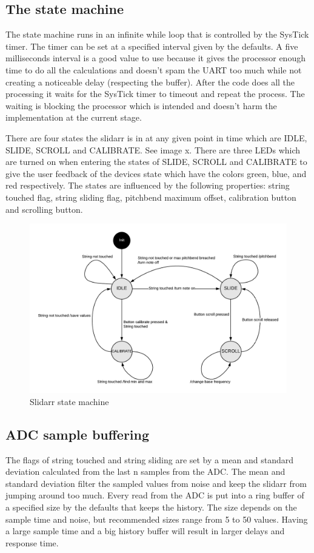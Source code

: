 \documentclass{article}
\begin{document}
\subsection{The state machine}

The state machine runs in an infinite while loop that is controlled by the SysTick timer. The timer can be set at a specified interval given by the defaults. A five milliseconds interval is a good value to use because it gives the processor enough time to do all the calculations and doesn't spam the UART too much while not creating a noticeable delay (respecting the buffer). After the code does all the processing it waits for the SysTick timer to timeout and repeat the process. The waiting is blocking the processor which is intended and doesn't harm the implementation at the current stage.

There are four states the slidarr is in at any given point in time which are IDLE, SLIDE, SCROLL and CALIBRATE. See image x. There are three LEDs which are turned on when entering the states of SLIDE, SCROLL and CALIBRATE to give the user feedback of the devices state which have the colors green, blue, and red respectively.
The states are influenced by the following properties: string touched flag, string sliding flag, pitchbend maximum offset, calibration button and scrolling button.

\begin{figure}[ht]
  \centering
  \includegraphics[width=1\textwidth]{SlidarrStateMachine.png}
  \caption{Slidarr state machine}
  \label{fig:slidarr state machine}
\end{figure}

\subsection{ADC sample buffering}
The flags of string touched and string sliding are set by a mean and standard deviation calculated from the last n samples from the ADC. The mean and standard deviation filter the sampled values from noise and keep the slidarr from jumping around too much.
Every read from the ADC is put into a ring buffer of a specified size by the defaults that keeps the history. The size depends on the sample time and noise, but recommended sizes range from 5 to 50 values. Having a large sample time and a big history buffer will result in larger delays and response time.
\end{document}
